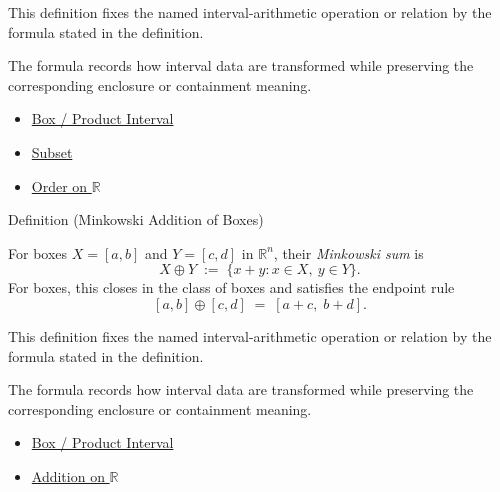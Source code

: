 \begin{remark*}
This definition fixes the named interval-arithmetic operation or relation by
the formula stated in the definition.
\end{remark*}

\begin{remark*}[Interpretation]
The formula records how interval data are transformed while preserving the
corresponding enclosure or containment meaning.
\end{remark*}

\begin{dependencies}
\begin{itemize}
  \item \hyperref[def:product-interval-box]{Box / Product Interval}
  \item \hyperref[def:subset]{Subset}
  \item \hyperref[def:order-on-r]{Order on $\mathbb{R}$}
\end{itemize}
\end{dependencies}

\begin{definitionbox}{Definition (Minkowski Addition of Boxes)}
\begin{definition}\label{def:box-add}
For boxes $X=[a,b]$ and $Y=[c,d]$ in $\mathbb{R}^n$, their \emph{Minkowski sum} is
\[
X\oplus Y \;:=\; \{x+y : x\in X,\ y\in Y\}.
\]
For boxes, this closes in the class of boxes and satisfies the endpoint rule
\[
[a,b]\oplus[c,d] \;=\; [a+c,\; b+d].
\]
\end{definition}
\end{definitionbox}

\begin{remark*}
This definition fixes the named interval-arithmetic operation or relation by
the formula stated in the definition.
\end{remark*}

\begin{remark*}[Interpretation]
The formula records how interval data are transformed while preserving the
corresponding enclosure or containment meaning.
\end{remark*}

\begin{dependencies}
\begin{itemize}
  \item \hyperref[def:product-interval-box]{Box / Product Interval}
  \item \hyperref[def:addition-on-r]{Addition on $\mathbb{R}$}
\end{itemize}
\end{dependencies}

